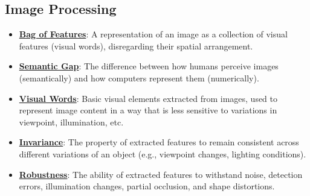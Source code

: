 \documentclass{article}%
\begin{document}
\subsection{Image Processing}%
\label{subsec:ImageProcessing}%
\begin{itemize}[leftmargin=*]%
\item \href{https://purdue.brightspace.com/d2l/common/assets/pdfjs-d2l-dist/1.0.14-legacy/web/viewer.html?file=\%2Fcontent\%2Fenforced\%2F1095467-wl.202510.CS.24300.001\%2F07L2-Vision.pdf\%3Fou\%3D1095467\&lang=en-us\&container=d2l-fileviewer-rendered-pdf\&fullscreen=d2l-fileviewer-rendered-pdf-dialog\&height=667#page=12}{\textbf{Bag of Features}}: A representation of an image as a collection of visual features (visual words), disregarding their spatial arrangement.%
\item \href{https://purdue.brightspace.com/d2l/common/assets/pdfjs-d2l-dist/1.0.14-legacy/web/viewer.html?file=\%2Fcontent\%2Fenforced\%2F1095467-wl.202510.CS.24300.001\%2F07L2-Vision.pdf\%3Fou\%3D1095467\&lang=en-us\&container=d2l-fileviewer-rendered-pdf\&fullscreen=d2l-fileviewer-rendered-pdf-dialog\&height=667#page=4}{\textbf{Semantic Gap}}: The difference between how humans perceive images (semantically) and how computers represent them (numerically).%
\item \href{https://purdue.brightspace.com/d2l/common/assets/pdfjs-d2l-dist/1.0.14-legacy/web/viewer.html?file=\%2Fcontent\%2Fenforced\%2F1095467-wl.202510.CS.24300.001\%2F07L2-Vision.pdf\%3Fou\%3D1095467\&lang=en-us\&container=d2l-fileviewer-rendered-pdf\&fullscreen=d2l-fileviewer-rendered-pdf-dialog\&height=667#page=14}{\textbf{Visual Words}}: Basic visual elements extracted from images, used to represent image content in a way that is less sensitive to variations in viewpoint, illumination, etc.%
\item \href{https://purdue.brightspace.com/d2l/common/assets/pdfjs-d2l-dist/1.0.14-legacy/web/viewer.html?file=\%2Fcontent\%2Fenforced\%2F1095467-wl.202510.CS.24300.001\%2F07L2-Vision.pdf\%3Fou\%3D1095467\&lang=en-us\&container=d2l-fileviewer-rendered-pdf\&fullscreen=d2l-fileviewer-rendered-pdf-dialog\&height=667#page=11}{\textbf{Invariance}}: The property of extracted features to remain consistent across different variations of an object (e.g., viewpoint changes, lighting conditions).%
\item \href{https://purdue.brightspace.com/d2l/common/assets/pdfjs-d2l-dist/1.0.14-legacy/web/viewer.html?file=\%2Fcontent\%2Fenforced\%2F1095467-wl.202510.CS.24300.001\%2F07L2-Vision.pdf\%3Fou\%3D1095467\&lang=en-us\&container=d2l-fileviewer-rendered-pdf\&fullscreen=d2l-fileviewer-rendered-pdf-dialog\&height=667#page=21}{\textbf{Robustness}}: The ability of extracted features to withstand noise, detection errors, illumination changes, partial occlusion, and shape distortions.%

\end{itemize}
\end{document}
